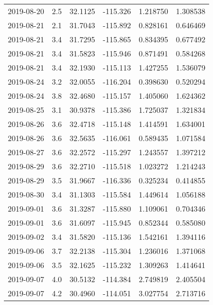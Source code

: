 \begin{tabular}{lrrrrr}
2019-08-20 &       2.5 &  32.1125 &  -115.326 &         1.218750 &         1.308538 \\
2019-08-21 &       2.1 &  31.7043 &  -115.892 &         0.828161 &         0.646469 \\
2019-08-21 &       3.4 &  31.7295 &  -115.865 &         0.834395 &         0.677492 \\
2019-08-21 &       3.4 &  31.5823 &  -115.946 &         0.871491 &         0.584268 \\
2019-08-21 &       3.4 &  32.1930 &  -115.113 &         1.427255 &         1.536079 \\
2019-08-24 &       3.2 &  32.0055 &  -116.204 &         0.398630 &         0.520294 \\
2019-08-24 &       3.8 &  32.4680 &  -115.157 &         1.405060 &         1.624362 \\
2019-08-25 &       3.1 &  30.9378 &  -115.386 &         1.725037 &         1.321834 \\
2019-08-26 &       3.6 &  32.4718 &  -115.148 &         1.414591 &         1.634001 \\
2019-08-26 &       3.6 &  32.5635 &  -116.061 &         0.589435 &         1.071584 \\
2019-08-27 &       3.6 &  32.2572 &  -115.297 &         1.243557 &         1.397212 \\
2019-08-29 &       3.6 &  32.2710 &  -115.518 &         1.023272 &         1.214243 \\
2019-08-29 &       3.5 &  31.9667 &  -116.336 &         0.325234 &         0.414855 \\
2019-08-30 &       3.4 &  31.1303 &  -115.584 &         1.449614 &         1.056188 \\
2019-09-01 &       3.6 &  31.3287 &  -115.880 &         1.109061 &         0.704346 \\
2019-09-01 &       3.6 &  31.6097 &  -115.945 &         0.852344 &         0.585080 \\
2019-09-02 &       3.4 &  31.5820 &  -115.136 &         1.542161 &         1.394116 \\
2019-09-06 &       3.7 &  32.2138 &  -115.304 &         1.236016 &         1.371068 \\
2019-09-06 &       3.5 &  32.1625 &  -115.232 &         1.309263 &         1.414641 \\
2019-09-07 &       4.0 &  30.5132 &  -114.384 &         2.749819 &         2.405504 \\
2019-09-07 &       4.2 &  30.4960 &  -114.051 &         3.027754 &         2.713716 \\

\end{tabular}
